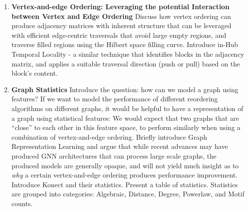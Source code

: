 \begin{enumerate}[label*=\arabic*.]
{        how computing it is easily parallelizable, and why it produces an improvement in performance for (certain) graph algorithms.
      }
      \item{\textbf{Vertex-and-edge Ordering: Leveraging the potential Interaction between Vertex and Edge Ordering}
      Discuss how vertex ordering can produce adjacency matrices with inherent structure that can be leveraged with efficient edge-centric traversals that avoid large empty regions, and traverse filled regions 
      using the Hilbert space filling curve. Introduce in-Hub Temporal Locality - a similar technique that identifies blocks in the adjacency matrix, and applies a suitable traversal direction (push or pull) based on the block's content.
      }
    \item{\textbf{Graph Statistics}
      Introduce the question: how can we model a graph using features? If we want to model the performance of different reordering algorithms on different graphs, it would be helpful to have a representation of a graph using
      statistical features: We would expect that two graphs that are ``close'' to each other in this feature space, to perform similarly when using a combination of vertex-and-edge ordering. Briefly introduce Graph Representation Learning and argue that while recent advances may have produced \ac{GNN} architectures that can process large scale graphs, the produced models are generally opaque, and will not yield much insight as to \textit{why} a certain
      vertex-and-edge ordering produces performance improvement. Introduce Konect and their statistics. Present a table of statistics. Statistics are grouped into categories: Algebraic, Distance, Degree, Powerlaw, and Motif counts.
    }
    \end{enumerate}